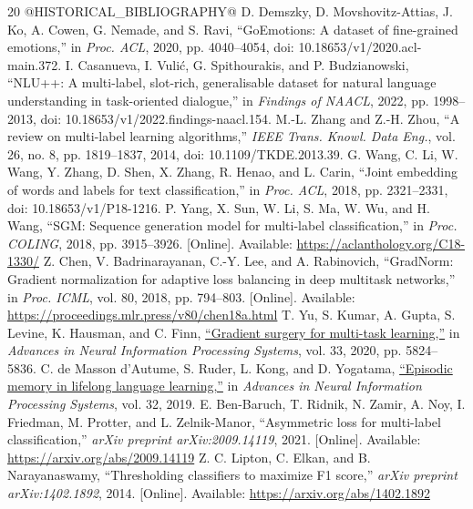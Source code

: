 \documentclass[conference]{IEEEtran}
\begin{document}
\begin{thebibliography}{20}
@HISTORICAL_BIBLIOGRAPHY@
D. Demszky, D. Movshovitz-Attias, J. Ko, A. Cowen, G. Nemade, and S. Ravi, ``GoEmotions: A dataset of fine-grained emotions,'' in \emph{Proc. ACL}, 2020, pp. 4040--4054, doi: 10.18653/v1/2020.acl-main.372.
I. Casanueva, I. Vuli\'{c}, G. Spithourakis, and P. Budzianowski, ``NLU++: A multi-label, slot-rich, generalisable dataset for natural language understanding in task-oriented dialogue,'' in \emph{Findings of NAACL}, 2022, pp. 1998--2013, doi: 10.18653/v1/2022.findings-naacl.154.
M.-L. Zhang and Z.-H. Zhou, ``A review on multi-label learning algorithms,'' \emph{IEEE Trans. Knowl. Data Eng.}, vol. 26, no. 8, pp. 1819--1837, 2014, doi: 10.1109/TKDE.2013.39.
G. Wang, C. Li, W. Wang, Y. Zhang, D. Shen, X. Zhang, R. Henao, and L. Carin, ``Joint embedding of words and labels for text classification,'' in \emph{Proc. ACL}, 2018, pp. 2321--2331, doi: 10.18653/v1/P18-1216.
P. Yang, X. Sun, W. Li, S. Ma, W. Wu, and H. Wang, ``SGM: Sequence generation model for multi-label classification,'' in \emph{Proc. COLING}, 2018, pp. 3915--3926. [Online]. Available: \url{https://aclanthology.org/C18-1330/}
Z. Chen, V. Badrinarayanan, C.-Y. Lee, and A. Rabinovich, ``GradNorm: Gradient normalization for adaptive loss balancing in deep multitask networks,'' in \emph{Proc. ICML}, vol. 80, 2018, pp. 794--803. [Online]. Available: \url{https://proceedings.mlr.press/v80/chen18a.html}
T. Yu, S. Kumar, A. Gupta, S. Levine, K. Hausman, and C. Finn, \href{https://proceedings.neurips.cc/paper/2020/hash/3fe78a8acf5fda99de95303940a2420c-Abstract.html}{``Gradient surgery for multi-task learning,''} in \emph{Advances in Neural Information Processing Systems}, vol. 33, 2020, pp. 5824--5836.
C. de Masson d'Autume, S. Ruder, L. Kong, and D. Yogatama, \href{https://proceedings.neurips.cc/paper/2019/hash/f8d2e80c1458ea2501f98a2cafadb397-Abstract.html}{``Episodic memory in lifelong language learning,''} in \emph{Advances in Neural Information Processing Systems}, vol. 32, 2019.
E. Ben-Baruch, T. Ridnik, N. Zamir, A. Noy, I. Friedman, M. Protter, and L. Zelnik-Manor, ``Asymmetric loss for multi-label classification,'' \emph{arXiv preprint arXiv:2009.14119}, 2021. [Online]. Available: \url{https://arxiv.org/abs/2009.14119}
Z. C. Lipton, C. Elkan, and B. Narayanaswamy, ``Thresholding classifiers to maximize F1 score,'' \emph{arXiv preprint arXiv:1402.1892}, 2014. [Online]. Available: \url{https://arxiv.org/abs/1402.1892}
\end{thebibliography}
\end{document}
